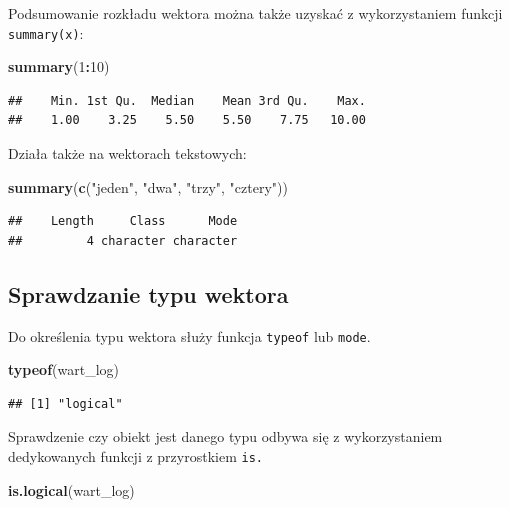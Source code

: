 \documentclass[]{book}
\newenvironment{Shaded}{\begin{snugshade}}{\end{snugshade}}
\newcommand{\KeywordTok}[1]{\textcolor[rgb]{0.13,0.29,0.53}{\textbf{#1}}}
\newcommand{\DecValTok}[1]{\textcolor[rgb]{0.00,0.00,0.81}{#1}}
\newcommand{\StringTok}[1]{\textcolor[rgb]{0.31,0.60,0.02}{#1}}
\newcommand{\OperatorTok}[1]{\textcolor[rgb]{0.81,0.36,0.00}{\textbf{#1}}}
\newcommand{\NormalTok}[1]{#1}
\begin{document}
Podsumowanie rozkładu wektora można także uzyskać z wykorzystaniem
funkcji \texttt{summary(x)}:

\begin{Shaded}
\begin{Highlighting}[]
\KeywordTok{summary}\NormalTok{(}\DecValTok{1}\OperatorTok{:}\DecValTok{10}\NormalTok{)}
\end{Highlighting}
\end{Shaded}

\begin{verbatim}
##    Min. 1st Qu.  Median    Mean 3rd Qu.    Max. 
##    1.00    3.25    5.50    5.50    7.75   10.00
\end{verbatim}

Działa także na wektorach tekstowych:

\begin{Shaded}
\begin{Highlighting}[]
\KeywordTok{summary}\NormalTok{(}\KeywordTok{c}\NormalTok{(}\StringTok{"jeden"}\NormalTok{, }\StringTok{"dwa"}\NormalTok{, }\StringTok{"trzy"}\NormalTok{, }\StringTok{"cztery"}\NormalTok{))}
\end{Highlighting}
\end{Shaded}

\begin{verbatim}
##    Length     Class      Mode 
##         4 character character
\end{verbatim}

\subsection{Sprawdzanie typu wektora}\label{sprawdzanie-typu-wektora}

Do określenia typu wektora służy funkcja \texttt{typeof} lub
\texttt{mode}.

\begin{Shaded}
\begin{Highlighting}[]
\KeywordTok{typeof}\NormalTok{(wart_log)}
\end{Highlighting}
\end{Shaded}

\begin{verbatim}
## [1] "logical"
\end{verbatim}

Sprawdzenie czy obiekt jest danego typu odbywa się z wykorzystaniem
dedykowanych funkcji z przyrostkiem \texttt{is.}

\begin{Shaded}
\begin{Highlighting}[]
\KeywordTok{is.logical}\NormalTok{(wart_log)}
\end{Highlighting}
\end{Shaded}
\end{document}
